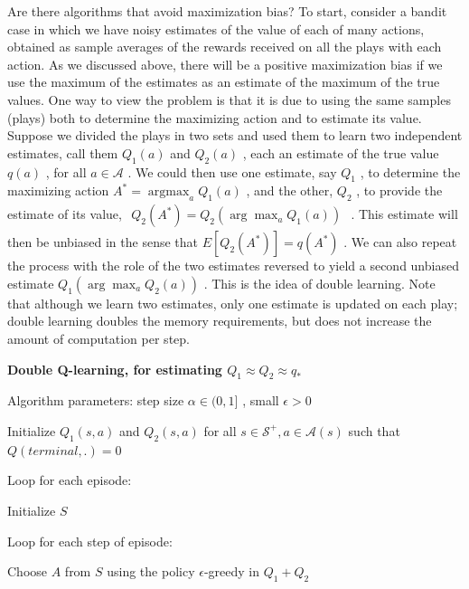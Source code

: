 \documentclass{article}
\begin{document}
Are there algorithms that avoid maximization bias? To start, consider a bandit case in which we have noisy estimates of the value of each of many actions, 
obtained as sample averages of the rewards received on all the plays with each action. As we discussed above, there will be a positive maximization bias 
if we use the maximum of the estimates as an estimate of the maximum of the true values. One way to view the problem is that it is due to using the same samples (plays) 
both to determine the maximizing action and to estimate its value. Suppose we divided the plays in two sets and used them to learn two independent estimates, 
call them $Q _ { 1 } ( a )$ and $Q _ { 2 } ( a )$ , each an estimate of the true value $q ( a )$ , for all $a \in \mathcal { A }$ . We could then use one estimate, 
say $Q _ { 1 }$ , to determine the maximizing action $A ^ { * } = \operatorname { a r g   m a x } _ { a } Q _ { 1 } ( a )$ , and the other, $Q _ { 2 }$ , 
to provide the estimate of its value, $\begin{array} { r } { Q _ { 2 } ( A ^ { * } ) = Q _ { 2 } ( \operatorname { a r g } \operatorname* { m a x } _ { a } Q _ { 1 } ( a ) ) } \end{array}$ . 
This estimate will then be unbiased in the sense that $ E [ Q _ { 2 } ( A ^ { * } ) ] = q ( A ^ { * } )$ . We can also repeat the process 
with the role of the two estimates reversed to yield a second unbiased estimate $Q _ { 1 } ( \operatorname { a r g } \operatorname { m a x } _ { a } Q _ { 2 } ( a ) )$ . 
This is the idea of double learning. Note that although we learn two estimates, only one estimate is updated on each play; double learning doubles the memory requirements, 
but does not increase the amount of computation per step.

\textbf{Double Q-learning, for estimating $ Q_1 \approx Q_2 \approx q_* $}

Algorithm parameters: step size $\alpha \in ( 0 , 1 ]$ , small $\epsilon > 0$

Initialize $Q _ { 1 } ( s , a )$ and $Q _ { 2 } ( s , a )$ for all $s \in \mathcal { S } ^ { + } , a \in \mathcal { A } ( s )$ such that $ Q(terminal, .) = 0 $

Loop for each episode:

\hspace{.5cm} Initialize $S$

\hspace{.5cm} Loop for each step of episode:

\hspace{1cm} Choose $A$ from $S$ using the policy $\epsilon$-greedy in $Q _ { 1 } + Q _ { 2 }$
\end{document}
